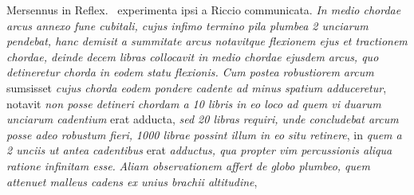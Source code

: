 %
\pend 
%
\pstart 
%
\hspace{1mm}\hspace{-1mm}%
%
%
%
Mersennus\protect{} in Reflex.\
%
experimenta  
%
ipsi a Riccio\protect{} %
%
communicata. \textit{In medio chordae arcus annexo fune cubitali, cujus infimo termino pila plumbea 2 
unciarum pendebat, hanc demisit a summitate arcus notavitque flexionem ejus et tractionem chordae, deinde decem libras collocavit in medio chordae ejusdem arcus, quo detineretur chorda in eodem statu flexionis. Cum postea robustiorem arcum} sumsisset \textit{cujus chorda eodem pondere cadente ad minus spatium adduceretur}, notavit \textit{non posse detineri chordam a 10 libris in eo loco ad quem vi duarum unciarum cadentium} erat adducta, \textit{sed 20 libras requiri, unde concludebat arcum posse adeo robustum fieri,} 
%
%
\textit{1000 librae possint illum in eo situ retinere}, %
in \textit{quem a 2 unciis ut antea cadentibus} erat \textit{adductus, qua propter vim percussionis aliqua ratione infinitam esse.} %
\pend
%
\pstart
\textit{Aliam observationem affert de globo plumbeo, quem attenuet malleus cadens ex unius brachii altitudine},  
